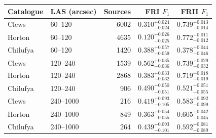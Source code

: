 \begin{tabular}{@{}llrrr@{}}
\toprule
Catalogue & LAS (arcsec) & Sources & FRI \(F_1\) & FRII \(F_1\) \\
\midrule
Clews & 60--120 & 6002 & \(0.310_{-0.024}^{+0.024}\) & \(0.739_{-0.014}^{+0.013}\) \\
Horton & 60--120 & 4635 & \(0.120_{-0.025}^{+0.026}\) & \(0.772_{-0.012}^{+0.011}\) \\
Chilufya & 60--120 & 1420 & \(0.388_{-0.059}^{+0.057}\) & \(0.378_{-0.046}^{+0.044}\) \\
Clews & 120--240 & 1539 & \(0.562_{-0.036}^{+0.035}\) & \(0.739_{-0.032}^{+0.029}\) \\
Horton & 120--240 & 2868 & \(0.383_{-0.032}^{+0.033}\) & \(0.719_{-0.019}^{+0.018}\) \\
Chilufya & 120--240 & 906 & \(0.490_{-0.051}^{+0.050}\) & \(0.521_{-0.055}^{+0.051}\) \\
Clews & 240--1000 & 216 & \(0.419_{-0.105}^{+0.093}\) & \(0.583_{-0.099}^{+0.092}\) \\
Horton & 240--1000 & 849 & \(0.363_{-0.055}^{+0.054}\) & \(0.605_{-0.045}^{+0.042}\) \\
Chilufya & 240--1000 & 264 & \(0.439_{-0.101}^{+0.093}\) & \(0.592_{-0.089}^{+0.081}\) \\
\bottomrule
\end{tabular}
